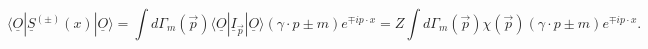 \begin{equation}
\langle\underline{O}|\underline{S}^{(\pm)}(x)|\underline{O}\rangle
=
\int d\Gamma_m(\vec p)
\langle \underline{O}|\underline{I}_{\vec p}|\underline{O}\rangle
(\gamma \cdot p\pm m)e^{\mp ip\cdot x}
=
Z
\int d\Gamma_m(\vec p)\chi(\vec p)
(\gamma \cdot p\pm m)e^{\mp ip\cdot x}.\nonumber
\end{equation}

